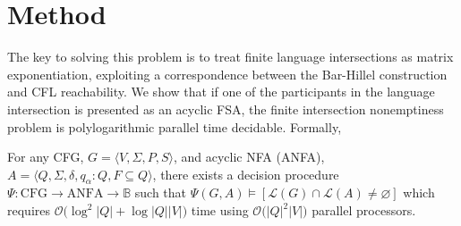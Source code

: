 \documentclass[sigplan,review,acmsmall,nonacm,screen,anonymous]{acmart}\settopmatter{printfolios=false,printccs=false,printacmref=false}
\begin{document}

\clearpage\section{Method}\label{sec:method}

The key to solving this problem is to treat finite language intersections as matrix exponentiation, exploiting a correspondence between the Bar-Hillel construction and CFL reachability. We show that if one of the participants in the language intersection is presented as an acyclic FSA, the finite intersection nonemptiness problem is polylogarithmic parallel time decidable. Formally,

\begin{theorem}\label{thm:parallel_decision_complexity}
  For any CFG, $G = \langle V, \Sigma, P, S\rangle$, and acyclic NFA (ANFA), $A = \langle Q, \Sigma, \delta, q_\alpha: Q, F \subseteq Q\rangle$, there exists a decision procedure $\Psi: \text{CFG} \rightarrow \text{ANFA} \rightarrow \mathbb{B}$ such that $\Psi(G, A) \models [\mathcal{L}(G)\cap\mathcal{L}(A) \neq \varnothing]$ which requires $\mathcal{O}\big(\log^2|Q|+\log|Q||V|\big)$ time using $\mathcal{O}\big(|Q|^2|V|\big)$ parallel processors.
\end{theorem}
\end{document}
